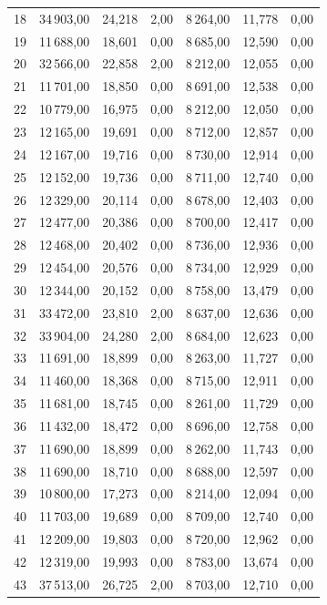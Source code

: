 \begin{longtable}{lrrrrrr}
18 & 34\,903,00 & 24,218 & 2,00 & 8\,264,00 & 11,778 & 0,00 \\
19 & 11\,688,00 & 18,601 & 0,00 & 8\,685,00 & 12,590 & 0,00 \\
20 & 32\,566,00 & 22,858 & 2,00 & 8\,212,00 & 12,055 & 0,00 \\
21 & 11\,701,00 & 18,850 & 0,00 & 8\,691,00 & 12,538 & 0,00 \\
22 & 10\,779,00 & 16,975 & 0,00 & 8\,212,00 & 12,050 & 0,00 \\
23 & 12\,165,00 & 19,691 & 0,00 & 8\,712,00 & 12,857 & 0,00 \\
24 & 12\,167,00 & 19,716 & 0,00 & 8\,730,00 & 12,914 & 0,00 \\
25 & 12\,152,00 & 19,736 & 0,00 & 8\,711,00 & 12,740 & 0,00 \\
26 & 12\,329,00 & 20,114 & 0,00 & 8\,678,00 & 12,403 & 0,00 \\
27 & 12\,477,00 & 20,386 & 0,00 & 8\,700,00 & 12,417 & 0,00 \\
28 & 12\,468,00 & 20,402 & 0,00 & 8\,736,00 & 12,936 & 0,00 \\
29 & 12\,454,00 & 20,576 & 0,00 & 8\,734,00 & 12,929 & 0,00 \\
30 & 12\,344,00 & 20,152 & 0,00 & 8\,758,00 & 13,479 & 0,00 \\
31 & 33\,472,00 & 23,810 & 2,00 & 8\,637,00 & 12,636 & 0,00 \\
32 & 33\,904,00 & 24,280 & 2,00 & 8\,684,00 & 12,623 & 0,00 \\
33 & 11\,691,00 & 18,899 & 0,00 & 8\,263,00 & 11,727 & 0,00 \\
34 & 11\,460,00 & 18,368 & 0,00 & 8\,715,00 & 12,911 & 0,00 \\
35 & 11\,681,00 & 18,745 & 0,00 & 8\,261,00 & 11,729 & 0,00 \\
36 & 11\,432,00 & 18,472 & 0,00 & 8\,696,00 & 12,758 & 0,00 \\
37 & 11\,690,00 & 18,899 & 0,00 & 8\,262,00 & 11,743 & 0,00 \\
38 & 11\,690,00 & 18,710 & 0,00 & 8\,688,00 & 12,597 & 0,00 \\
39 & 10\,800,00 & 17,273 & 0,00 & 8\,214,00 & 12,094 & 0,00 \\
40 & 11\,703,00 & 19,689 & 0,00 & 8\,709,00 & 12,740 & 0,00 \\
41 & 12\,209,00 & 19,803 & 0,00 & 8\,720,00 & 12,962 & 0,00 \\
42 & 12\,319,00 & 19,993 & 0,00 & 8\,783,00 & 13,674 & 0,00 \\
43 & 37\,513,00 & 26,725 & 2,00 & 8\,703,00 & 12,710 & 0,00 \\

\end{longtable}
